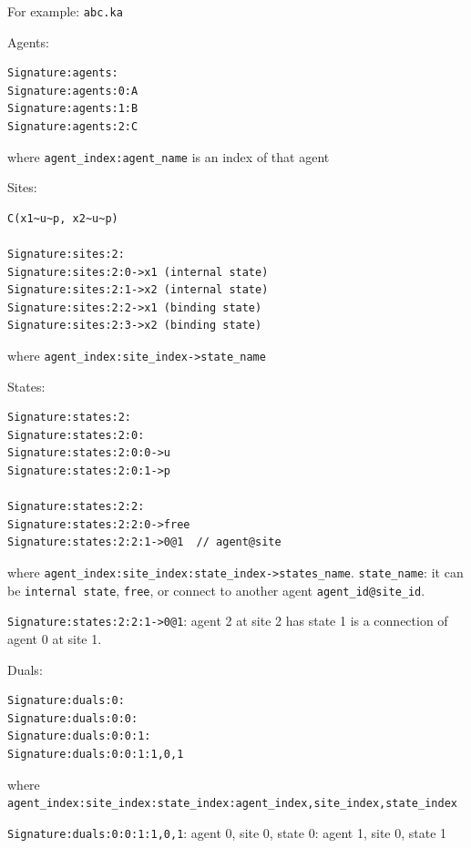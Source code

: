 \documentclass{article}
\begin{document}
For example: \verb|abc.ka|

\begin{i}
\item Agents:

\begin{verbatim}
Signature:agents:
Signature:agents:0:A
Signature:agents:1:B
Signature:agents:2:C
\end{verbatim}

  where \verb|agent_index:agent_name| is an index of that agent

\item Sites:

\begin{verbatim}
C(x1~u~p, x2~u~p)

Signature:sites:2:
Signature:sites:2:0->x1 (internal state)
Signature:sites:2:1->x2 (internal state)
Signature:sites:2:2->x1 (binding state)
Signature:sites:2:3->x2 (binding state)
\end{verbatim}

  where \verb|agent_index:site_index->state_name|

\item States:

\begin{verbatim}
Signature:states:2:
Signature:states:2:0:
Signature:states:2:0:0->u
Signature:states:2:0:1->p

Signature:states:2:2:
Signature:states:2:2:0->free
Signature:states:2:2:1->0@1  // agent@site
\end{verbatim}

  where
  \verb|agent_index:site_index:state_index->states_name|. \verb|state_name|:
  it can be \verb|internal state|, \verb|free|, or connect to another agent
  \verb|agent_id@site_id|.

  \verb|Signature:states:2:2:1->0@1|: agent 2 at site 2 has state 1 is a
  connection of agent 0 at site 1.

\item Duals:

\begin{verbatim}
Signature:duals:0:
Signature:duals:0:0:
Signature:duals:0:0:1:
Signature:duals:0:0:1:1,0,1
\end{verbatim}

  where
  \verb|agent_index:site_index:state_index:agent_index,site_index,state_index|

\verb|Signature:duals:0:0:1:1,0,1|: agent 0, site 0, state 0: agent 1, site
0, state 1
\end{i}
\end{document}
